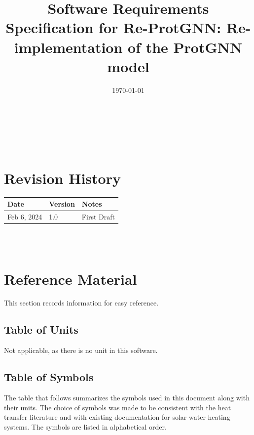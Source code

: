 \documentclass[12pt]{article}
\begin{document}
\title{Software Requirements Specification for Re-ProtGNN: Re-implementation of the ProtGNN model} 
\author{\authname}
\date{\today}
	
\maketitle

~\newpage


\tableofcontents

~\newpage

\section*{Revision History}

\begin{tabularx}{\textwidth}{p{3cm}p{2cm}X}
\toprule {\bf Date} & {\bf Version} & {\bf Notes}\\
\midrule
Feb 6, 2024 & 1.0 & First Draft\\
\bottomrule
\end{tabularx}

~\\

~\newpage

\section{Reference Material}

This section records information for easy reference.

\subsection{Table of Units}
Not applicable, as there is no unit in this software.

\subsection{Table of Symbols}

The table that follows summarizes the symbols used in this document along with
their units.  The choice of symbols was made to be consistent with the heat
transfer literature and with existing documentation for solar water heating
systems.  The symbols are listed in alphabetical order.
\end{document}
